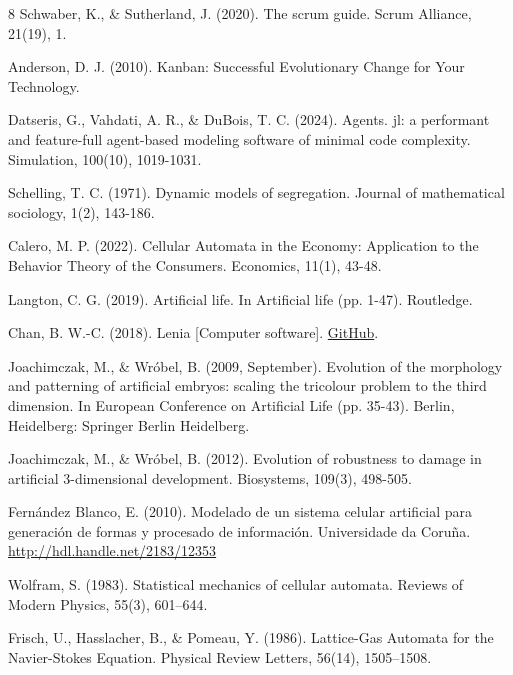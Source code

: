 \documentclass[runningheads]{llncs}
\begin{document}
\begin{thebibliography}{8}
Schwaber, K., \& Sutherland, J. (2020). The scrum guide. Scrum Alliance, 21(19), 1.

Anderson, D. J. (2010). 
Kanban: Successful Evolutionary Change for Your Technology.

Datseris, G., Vahdati, A. R., \& DuBois, T. C. (2024). Agents. jl: a performant and feature-full agent-based modeling software of minimal code complexity. Simulation, 100(10), 1019-1031. 

Schelling, T. C. (1971). Dynamic models of segregation. Journal of mathematical sociology, 1(2), 143-186. 

Calero, M. P. (2022). Cellular Automata in the Economy: Application to the Behavior Theory of the Consumers. Economics, 11(1), 43-48. 

Langton, C. G. (2019). Artificial life. In Artificial life (pp. 1-47). Routledge.

Chan, B. W.-C. (2018). Lenia [Computer software]. \href{https://github.com/Chakazul/Lenia}{GitHub}.

Joachimczak, M., \& Wróbel, B. (2009, September). Evolution of the morphology and patterning of artificial embryos: scaling the tricolour problem to the third dimension. In European Conference on Artificial Life (pp. 35-43). Berlin, Heidelberg: Springer Berlin Heidelberg. 

Joachimczak, M., \& Wróbel, B. (2012). Evolution of robustness to damage in artificial 3-dimensional development. Biosystems, 109(3), 498-505. 

Fernández Blanco, E. (2010). Modelado de un sistema celular artificial para generación de formas y procesado de información. Universidade da Coruña.
\url{http://hdl.handle.net/2183/12353}

Wolfram, S. (1983). Statistical mechanics of cellular automata. Reviews of Modern Physics, 55(3), 601–644.

Frisch, U., Hasslacher, B., \& Pomeau, Y. (1986). Lattice-Gas Automata for the Navier-Stokes Equation. Physical Review Letters, 56(14), 1505–1508.


\end{thebibliography}
\end{document}
